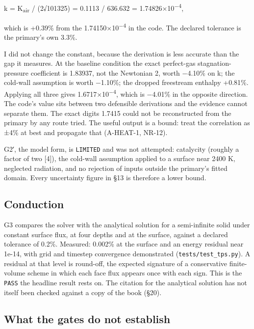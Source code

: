 \documentclass[
  a4paper,
  11pt]{article}
\begin{document}
\begin{center}
k = K\textsubscript{air} /\allowbreak{} (2√101325) = 0.1113 /\allowbreak{} 636.632 = 1.74826×10\textsuperscript{−4},
\end{center}

which is +0.39\% from the 1.74150×10\textsuperscript{−4} in the code.
The declared tolerance is the primary's own 3.3\%.

I did not change the constant, because the derivation is less accurate
than the gap it measures. At the baseline condition the exact
perfect-gas stagnation-pressure coefficient is 1.83937, not the
Newtonian 2, worth −4.10\% on k; the cold-wall assumption is worth
−1.10\%; the dropped freestream enthalpy +0.81\%. Applying all three
gives 1.6717×10\textsuperscript{−4}, which is −4.01\% in the opposite
direction. The code's value sits between two defensible derivations and
the evidence cannot separate them. The exact digits 1.7415 could not be
reconstructed from the primary by any route tried. The useful output is
a bound: treat the correlation as ±4\% at best and propagate that
(A-HEAT-1, NR-12).

G2{\symfont ′}, the model form, is \texttt{LIMITED} and was not
attempted: catalycity (roughly a factor of two {[}4{]}), the cold-wall
assumption applied to a surface near 2400 K, neglected radiation, and no
rejection of inputs outside the primary's fitted domain. Every
uncertainty figure in §13 is therefore a lower bound.

\subsection{Conduction}

G3 compares the solver with the analytical solution for a semi-infinite
solid under constant surface flux, at four depths and at the surface,
against a declared tolerance of 0.2\%. Measured: 0.002\% at the surface
and an energy residual near 1e-14, with grid and timestep convergence
demonstrated (\texttt{tests/\allowbreak{}test\_\allowbreak{}tps.py}). A
residual at that level is round-off, the expected signature of a
conservative finite-volume scheme in which each face flux appears once
with each sign. This is the \texttt{PASS} the headline result rests on.
The citation for the analytical solution has not itself been checked
against a copy of the book (§20).

\subsection{What the gates do not establish}
\end{document}
